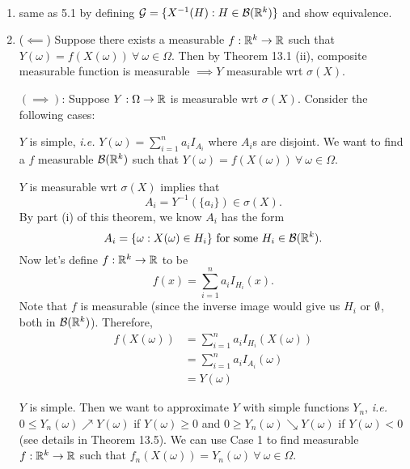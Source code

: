 \documentclass[class=article,crop=false]{standalone}
\begin{document}
\begin{prf}
~\begin{enumerate}[label=(\roman*)]
	\item same as 5.1 by defining $ \mathcal{G}= \{X^{-1}(H): H \in \mathcal{B}( \mathbb{R}^{k})\} $ and show equivalence.
	\item ($ \impliedby$) Suppose there exists a measurable $ f: \mathbb{R}^{k} \to \mathbb{R}$ such that $ Y(\omega) = f(X(\omega)) \ \forall \ \omega \in \Omega$. Then by Theorem 13.1 (ii), composite measurable function is measurable $ \implies Y$ measurable wrt $ \sigma(X)$.

		$ (\implies)$: Suppose $ Y: \Omega \to \mathbb{R}$ is measurable wrt $ \sigma(X)$. Consider the following cases:
		\begin{case}[1]
			$ Y$ is simple, \emph{i.e.} $ Y(\omega) = \sum_{ i= 1}^{ n} a_i I_{A_i}$ where $ A_i$s are disjoint. We want to find a $ f$ measurable $ \mathcal{B}(\mathbb{R}^{k})$ such that $ Y(\omega) = f(X(\omega)) \ \forall \ \omega \in \Omega$. 

			$ Y$ is measurable wrt  $ \sigma(X)$ implies that
			\[
				A_i = Y^{-1}(\{a_i\} ) \in \sigma(X)
			.\]
			By part (i) of this theorem, we know $ A_i $ has the form
			 \[
				 A_i = \{\omega: X(\omega) \in H_i\} \text{ for some } H_i \in \mathcal{B}(\mathbb{R}^{k}) 
			.\] 
			Now let's define $ f:\mathbb{R}^{k} \to \mathbb{R}$ to be
				\[
					f(x) = \sum_{ i= 1}^{ n} a_i I_{H_i}(x)
				.\]
				Note that $ f$ is measurable (since the inverse image would give us $ H_i$ or $ \emptyset$, both in $ \mathcal{ B}(\mathbb{R}^{k})$). Therefore,
				\begin{align*}
					f(X(\omega)) &= \sum_{ i= 1}^{ n} a_i I_{H_i}(X(\omega))\\
						     &= \sum_{ i= 1}^{ n} a_i I_{A_i}(\omega) \\
						     &= Y(\omega)
				\end{align*}
		\end{case}
		\begin{case}[2]
			$ Y$ is simple. Then we want to approximate  $ Y$ with simple functions  $ Y_n$, \emph{i.e.} $ 0\leq Y_n(\omega) \nearrow Y(\omega)$ if $ Y(\omega) \geq 0$ and $ 0\geq Y_n(\omega) \searrow Y(\omega)$ if $ Y(\omega) < 0$ (see details in Theorem 13.5). We can use Case 1 to find measurable $ f: \mathbb{R}^{k} \to \mathbb{R}$ such that $ f_n(X(\omega)) = Y_n(\omega) \ \forall \ \omega \in \Omega$.


\end{case}
\end{enumerate}
\end{prf}
\end{document}

